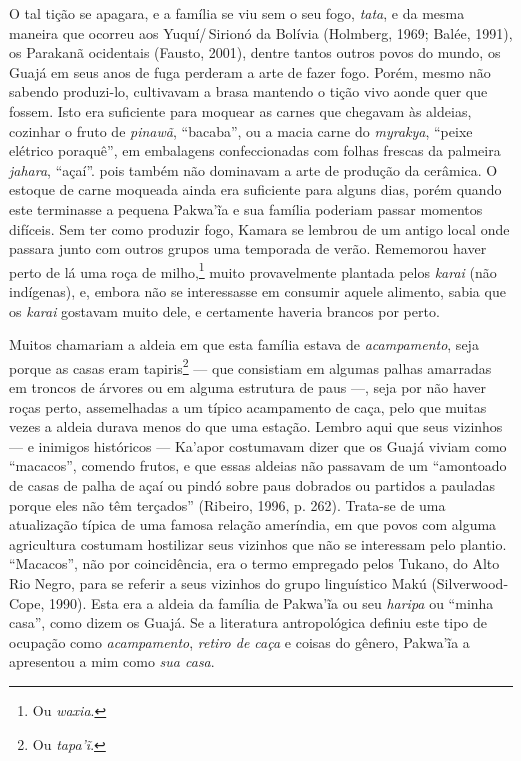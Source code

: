 O tal tição se apagara, e a família se viu sem o seu fogo,
\textit{tata}, e da mesma maneira que ocorreu aos Yuquí/\,Sirionó da Bolívia
(Holmberg, 1969; Balée, 1991), os Parakanã ocidentais (Fausto, 2001),
dentre tantos outros povos do mundo, os Guajá em seus anos de fuga
perderam a arte de fazer fogo. Porém, mesmo não sabendo produzi-lo,
cultivavam a brasa mantendo o tição vivo aonde quer que fossem. Isto era
suficiente para moquear as carnes que chegavam às aldeias, cozinhar o
fruto de \textit{pinawã}, ``bacaba'', ou a macia carne do \textit{myrakya}, ``peixe elétrico
poraquê'', em embalagens confeccionadas com folhas frescas
da palmeira \textit{jahara}, ``açaí''. pois também não dominavam a arte de
produção da cerâmica. O estoque de carne moqueada ainda era suficiente
para alguns dias, porém quando este terminasse a pequena Pakwa'ĩa e sua
família poderiam passar momentos difíceis. Sem ter como produzir fogo,
Kamara se lembrou de um antigo local onde passara junto com outros
grupos uma temporada de verão. Rememorou haver perto de lá uma roça de
milho,\footnote{Ou \textit{waxia}.} muito provavelmente plantada pelos \textit{karai}
(não indígenas), e, embora não se interessasse em consumir aquele
alimento, sabia que os \textit{karai} gostavam muito dele, e certamente
haveria brancos por perto.

Muitos chamariam a aldeia em que esta família estava de \textit{acampamento},
seja porque as casas eram tapiris\footnote{Ou \textit{tapa'ĩ}.} --- que consistiam em
algumas palhas amarradas em troncos de árvores ou em alguma estrutura de
paus ---, seja por não haver roças perto, assemelhadas a um típico
acampamento de caça, pelo que muitas vezes a aldeia durava menos do que
uma estação. Lembro aqui que seus vizinhos --- e inimigos históricos ---
Ka'apor costumavam dizer que os Guajá viviam como ``macacos'', comendo
frutos, e que essas aldeias não passavam de um ``amontoado de casas de
palha de açaí ou pindó sobre paus dobrados ou partidos a pauladas porque
eles não têm terçados'' (Ribeiro, 1996, p. 262). Trata-se de uma
atualização típica de uma famosa relação ameríndia, em que povos com
alguma agricultura costumam hostilizar seus vizinhos que não se
interessam pelo plantio. ``Macacos'', não por coincidência, era o termo
empregado pelos Tukano, do Alto Rio Negro, para se referir a seus
vizinhos do grupo linguístico Makú (Silverwood-Cope, 1990). Esta era a
aldeia da família de Pakwa'ĩa ou seu \textit{haripa} ou ``minha casa'',
como dizem os Guajá. Se a literatura antropológica definiu este tipo de
ocupação como \textit{acampamento}, \textit{retiro de caça} e coisas do gênero,
Pakwa'ĩa a apresentou a mim como \textit{sua casa}.

